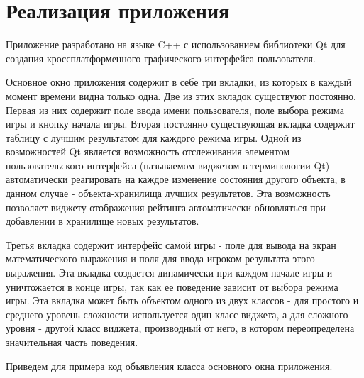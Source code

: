 \documentclass[a4paper,12pt]{article}
\begin{document}
\section{Реализация приложения}

Приложение разработано на языке C++ с использованием библиотеки Qt для
создания кроссплатформенного графического интерфейса пользователя.

Основное окно приложения содержит в себе три вкладки, из которых в каждый
момент времени видна только одна. Две из этих вкладок существуют постоянно.
Первая из них содержит поле ввода имени пользователя, поле выбора режима игры
и кнопку начала игры. Вторая постоянно существующая вкладка содержит таблицу
с лучшим результатом для каждого режима игры. Одной из возможностей Qt является
возможность отслеживания элементом пользовательского интерфейса (называемом
виджетом в терминологии Qt) автоматически реагировать на каждое изменение
состояния другого объекта, в данном случае - объекта-хранилища лучших результатов.
Эта возможность позволяет виджету отображения рейтинга автоматически обновляться
при добавлении в хранилище новых результатов.

Третья вкладка содержит интерфейс самой игры - поле для вывода на экран
математического выражения и поля для ввода игроком результата этого
выражения. Эта вкладка создается динамически при каждом начале игры и
уничтожается в конце игры, так как ее поведение зависит от выбора режима
игры. Эта вкладка может быть объектом одного из двух классов - для
простого и среднего уровень сложности используется один класс виджета,
а для сложного уровня - другой класс виджета, производный от него, в котором
переопределена значительная часть поведения.


Приведем для примера код объявления класса основного окна приложения.
\end{document}
